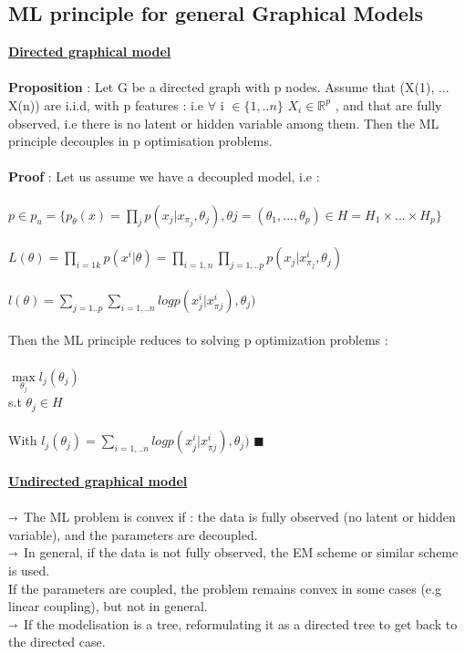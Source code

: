 \documentclass[12pt]{report}
\begin{document}
\subsection{ML principle for general Graphical Models}
\textbf{\underline{Directed graphical model}}~\\
~\\
\textbf{Proposition} : Let G be a directed graph with p nodes. Assume that (X(1), ... X(n)) are i.i.d, with p features : i.e $\forall$ i $\in \{1,..n\}$ $X_{i} \in \mathbb{R}^{p}$ , and that are fully observed, i.e there is no latent or hidden variable among them. Then the ML principle decouples in p optimisation problems.~\\
~\\
\textbf{Proof} : Let us assume we have a decoupled model, i.e : ~\\
~\\
$p \in p_{u} = \{p_{\theta}(x)=\prod_{j} p(x_{j} | x_{\pi_{j}}, \theta_{j}), \theta j = (\theta_{1}, ..., \theta_{p}) \in H = H_{1}\times...\times H_{p}\}$~\\
~\\
$L(\theta) = \prod \limits_{i =1 k} p(x^{i}|\theta) = \prod \limits_{i=1, n} \prod \limits_{j=1, .. p } p(x_{j}|x^{i}_{\pi_{j}},\theta_{j})    $~\\
~\\
$l(\theta) = \sum_{j=1..p} \sum_{i=1,..n} log p(x^{i}_{j} | x^{i}_{\pi{j}}), \theta_{j})$~\\
~\\
Then the ML principle reduces to solving p optimization problems :~\\
~\\
$\max\limits_{\theta_{j}}   l_{j}(\theta_{j}) $~\\
s.t $ \theta_{j} \in H$~\\
~\\
With $l_{j}(\theta_{j})=\sum_{i=1,..n} log p(x^{i}_{j} | x^{i}_{\pi{j}}), \theta_{j})$  $\blacksquare$~\\
~\\
\textbf{\underline{Undirected graphical model}}~\\
~\\
$\shortrightarrow$ The ML problem is convex if : the data is fully observed (no latent or hidden variable), and the parameters are decoupled.~\\
$\shortrightarrow$ In general, if the data is not fully observed, the EM scheme or similar scheme is used.~\\
If the parameters are coupled, the problem remains convex in some cases (e.g linear coupling), but not in general.~\\
$\shortrightarrow$ If the modelisation is a tree, reformulating it as a directed tree to get back to the directed case.
\end{document}
